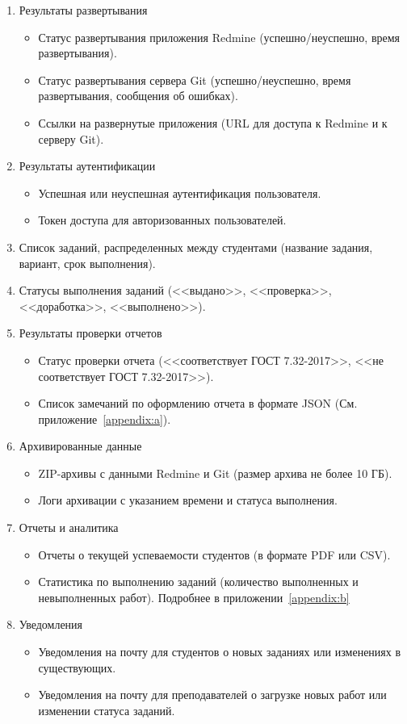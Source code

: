 \begin{enumerate}
	\item Результаты развертывания
	\begin{itemize} 
		\item Статус развертывания приложения Redmine (успешно/неуспешно, время развертывания).
		\item Статус развертывания сервера Git (успешно/неуспешно, время развертывания, сообщения об ошибках).
		\item Ссылки на развернутые приложения (URL для доступа к Redmine и к серверу Git).
	\end{itemize}
	\item Результаты аутентификации
	\begin{itemize} 
		\item Успешная или неуспешная аутентификация пользователя.
		\item Токен доступа для авторизованных пользователей.
	\end{itemize}
	\item Список заданий, распределенных между студентами (название задания, вариант, срок выполнения).
	\item Статусы выполнения заданий (<<выдано>>, <<проверка>>, <<доработка>>, <<выполнено>>).
	\item Результаты проверки отчетов
	\begin{itemize} 
		\item Статус проверки отчета (<<соответствует ГОСТ 7.32-2017>>, <<не соответствует ГОСТ 7.32-2017>>).
		\item Список замечаний по оформлению отчета в формате JSON (См. приложение~\ref{appendix:a}).
	\end{itemize}
	\item Архивированные данные
	\begin{itemize} 
		\item ZIP-архивы с данными Redmine и Git (размер архива не более 10 ГБ).
		\item Логи архивации с указанием времени и статуса выполнения.
	\end{itemize}
	\item Отчеты и аналитика
	\begin{itemize} 
		\item Отчеты о текущей успеваемости студентов (в формате PDF или CSV).
		\item Статистика по выполнению заданий (количество выполненных и невыполненных работ). Подробнее в приложении~\ref{appendix:b}
	\end{itemize}
	\item Уведомления
	\begin{itemize} 
		\item Уведомления на почту для студентов о новых заданиях или изменениях в существующих.
		\item Уведомления на почту для преподавателей о загрузке новых работ или изменении статуса заданий.
	\end{itemize}
\end{enumerate}

